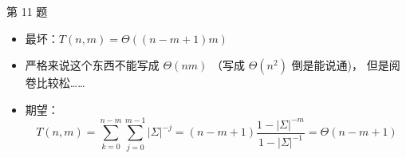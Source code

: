 \documentclass[10pt,mathserif]{beamer}
\begin{document}
\begin{frame}{第 11 题}
	
	\pause
	\begin{itemize}
		\item 最坏：$T(n, m) = \Theta((n - m + 1)m)$
		\item 严格来说这个东西不能写成 $\Theta(nm)$
			（写成 $\Theta(n^2)$ 倒是能说通)，
			但是阅卷比较松……
		\item 期望：$$T(n, m) = \sum_{k=0}^{n - m} \sum_{j=0}^{m - 1}
			|\Sigma|^{-j} = (n - m + 1)
			\frac{1 - |\Sigma|^{-m}}{1 - |\Sigma|^{-1}} =
			\Theta(n - m + 1)$$
	\end{itemize}
\end{frame}
\end{document}
